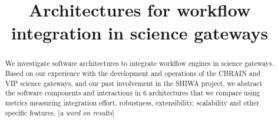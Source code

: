 \documentclass[preprint,3p,twocolumn]{elsarticle}
\newcommand{\todo}[1]{\color{blue}\xspace[\emph{#1}]\xspace\color{black}}
\begin{document}
\begin{frontmatter}



\title{Architectures for workflow integration in science gateways}


\author{}

\address{}

\begin{abstract}
  We investigate software architectures to integrate workflow engines
  in science gateways. Based on our experience with the development
  and operations of the CBRAIN and VIP science gateways, and our past
  involvement in the SHIWA project, we abstract the software
  components and interactions in 6 architectures that we compare using
  metrics measuring integration effort, robustness, extensibility,
  scalability and other specific features. \todo{a word on results}
\end{abstract}

\begin{keyword}



\end{keyword}

\end{frontmatter}

\end{document}
